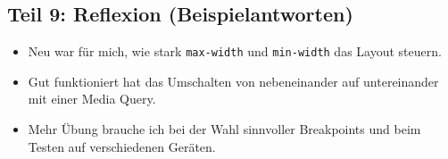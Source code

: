 \documentclass[a4paper,12pt]{article}
\begin{document}
\subsection*{Teil 9: Reflexion (Beispielantworten)}
\begin{itemize}
  \item Neu war f\"ur mich, wie stark \texttt{max-width} und \texttt{min-width} das Layout steuern.
  \item Gut funktioniert hat das Umschalten von nebeneinander auf untereinander mit einer Media Query.
  \item Mehr \"Ubung brauche ich bei der Wahl sinnvoller Breakpoints und beim Testen auf verschiedenen Ger\"aten.
\end{itemize}
\end{document}
